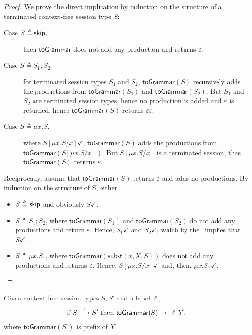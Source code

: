 \begin{proof}
	We prove the direct implication by induction on the structure of a terminated
	context-free session type $S$:
	\begin{description}
		\item[Case $S\triangleq \skipk$,] then $\mathsf{toGrammar}$ does not 
		add any production and returns $\varepsilon$.
		\item[Case $S\triangleq S_1;S_2$] for terminated session types $S_1$ and
		$S_2$, $\mathsf{toGrammar}(S)$ recursively adds the productions from 
		$\mathsf{toGrammar}(S_1)$ and $\mathsf{toGrammar}(S_2)$. But $S_1$ and 
		$S_2$ are terminated session types, hence no production is added and
		$\varepsilon$ is returned, hence $\mathsf{toGrammar}(S)$
		returns $\varepsilon\varepsilon$.
		\item[Case $S\triangleq \mu x. S$,] where $S[\mu x.S/x] \checkmark$,
		$\mathsf{toGrammar}(S)$ adds the productions from \linebreak
		$\mathsf{toGrammar}(S[\mu x.S/x])$. But $S[\mu x.S/x]$ is a terminated
		session, thus $\mathsf{toGrammar}(S)$ returns $\varepsilon$.
	\end{description}
	Reciprocally, assume that $\mathsf{toGrammar}(S)$ returns $\varepsilon$ and
	adds no productions. By induction on the structure of S, either:
	\begin{itemize}
		\item $S\triangleq \skipk$ and obviously $S\checkmark$.
		\item $S\triangleq S_1;S_2$, where $\mathsf{toGrammar}(S_1)$ and
			  $\mathsf{toGrammar}(S_2)$ do not add any productions and
			  return $\varepsilon$. Hence, $S_1\checkmark$ and $S_2\checkmark$,
			  which by the \LTS\ implies that $S\checkmark$.
		\item $S\triangleq \mu x. S_1$, where $\mathsf{toGrammar}(\mathsf{subst}(x,X,S))$
			  does not add any productions and returns $\varepsilon$. Hence, 
			  $S[\mu x.S/x] \checkmark$ and, then, $\mu x. S_1 \checkmark$.
	\end{itemize}
\end{proof}

\begin{lemma}
Given context-free session types $S,S'$ and a label $\ell$,
	\[ \text{if } S \LTSderives[\ell] S' \text{ then } 
	\mathsf{toGrammar}(S) \rightarrow \enspace \ell \enspace \vec Y, \]
	where $\mathsf{toGrammar}(S')$ is prefix of $\vec Y$.
\end{lemma}

